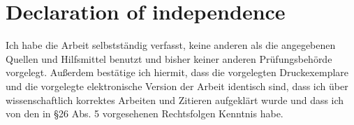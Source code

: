 \documentclass{article}
\begin{document}
\section{Declaration of independence}
Ich habe die Arbeit selbstständig verfasst, keine anderen als die angegebenen Quellen und Hilfsmittel benutzt und bisher keiner anderen Prüfungsbehörde vorgelegt. Außerdem bestätige ich hiermit, dass die vorgelegten Druckexemplare und die vorgelegte elektronische Version der Arbeit identisch sind, dass ich über wissenschaftlich korrektes Arbeiten und Zitieren aufgeklärt wurde und dass ich von den in §26 Abs. 5 vorgesehenen Rechtsfolgen Kenntnis habe.


 



\end{document}
